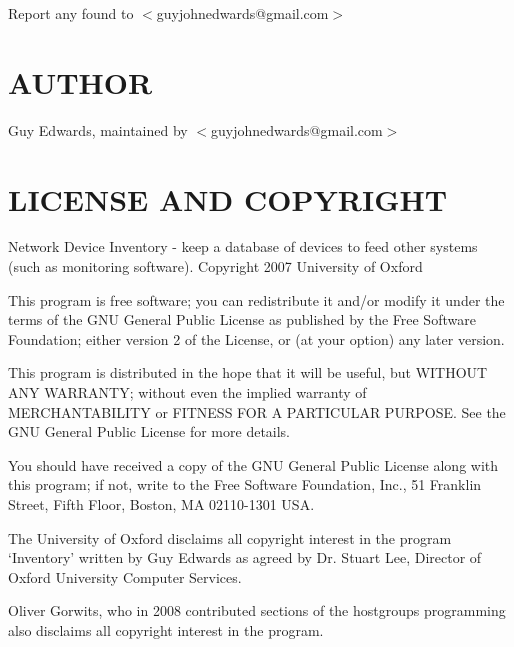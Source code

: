 \documentclass{book}
\begin{document}
Report any found to $<$guyjohnedwards@gmail.com$>$


\section{AUTHOR}
\label{_AUTHOR}
\hypertarget{_AUTHOR}{}



Guy Edwards, maintained by $<$guyjohnedwards@gmail.com$>$


\section{LICENSE AND COPYRIGHT}
\label{_LICENSE_AND_COPYRIGHT}
\hypertarget{_LICENSE_AND_COPYRIGHT}{}



Network Device Inventory - keep a database of devices to feed other systems (such as monitoring software). Copyright 2007 University of Oxford



This program is free software; you can redistribute it and/or modify it under the terms of the GNU General Public License as published by the Free Software Foundation; either version 2 of the License, or (at your option) any later version.



This program is distributed in the hope that it will be useful, but WITHOUT ANY WARRANTY; without even the implied warranty of MERCHANTABILITY or FITNESS FOR A PARTICULAR PURPOSE. See the GNU General Public License for more details.



You should have received a copy of the GNU General Public License along with this program; if not, write to the Free Software Foundation, Inc., 51 Franklin Street, Fifth Floor, Boston, MA 02110-1301 USA.



The University of Oxford disclaims all copyright interest in the program `Inventory' written by Guy Edwards as agreed by Dr. Stuart Lee, Director of Oxford University Computer Services.



Oliver Gorwits, who in 2008 contributed sections of the hostgroups programming also disclaims all copyright interest in the program.


\end{document}
